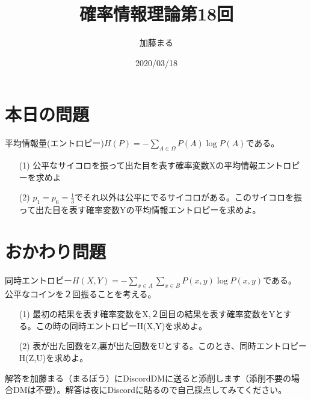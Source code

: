 \documentclass[a4j,uplatex,dvipdfmx]{jsarticle}
\title{確率情報理論第18回}
\author{加藤まる}
\date{2020/03/18}
\begin{document}
\maketitle

\section*{本日の問題}
平均情報量(エントロピー)$H(P)=-\sum_{A\in \Omega} P(A)\log{P(A)}$である。
\begin{itemize}
  \item[(1)]公平なサイコロを振って出た目を表す確率変数Xの平均情報エントロピーを求めよ
  \item[(2)]$p_1=p_6=\frac{1}{3}$でそれ以外は公平にでるサイコロがある。このサイコロを振って出た目を表す確率変数Yの平均情報エントロピーを求めよ。
\end{itemize}



\section*{おかわり問題}
同時エントロピー$\displaystyle H(X,Y)=-\sum_{x\in A} \sum_{x\in B}P(x,y)\log{P(x,y)}$である。\\
公平なコインを２回振ることを考える。
\begin{itemize}
  \item[(1)]最初の結果を表す確率変数をX,２回目の結果を表す確率変数をYとする。この時の同時エントロピーH(X,Y)を求めよ。
  \item[(2)]表が出た回数をZ,裏が出た回数をUとする。このとき、同時エントロピーH(Z,U)を求めよ。\\
\end{itemize}
解答を加藤まる（まるぼう）にDiscordDMに送ると添削します（添削不要の場合DMは不要）。解答は夜にDiscordに貼るので自己採点してみてください。
\end{document}
